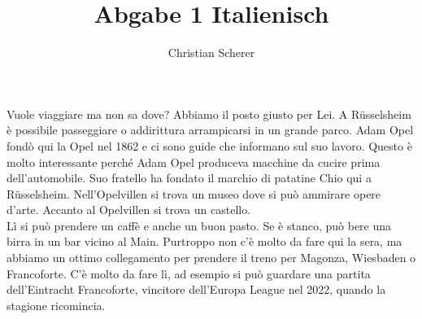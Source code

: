 \documentclass[10pt,a4paper]{article}
\author{Christian Scherer}
\title{Abgabe 1 Italienisch}
\date{}
\begin{document}
\maketitle
Vuole viaggiare ma non sa dove? Abbiamo il posto giusto per Lei.
A Rüsselsheim è possibile passeggiare o addirittura arrampicarsi in un grande parco. Adam Opel fondò qui la Opel nel 1862 e ci sono guide che informano sul suo lavoro. Questo è molto interessante perché Adam Opel produceva macchine da cucire prima dell'automobile. Suo fratello ha fondato il marchio di patatine Chio qui a Rüsselsheim. Nell'Opelvillen si trova un museo dove si può ammirare opere d'arte. Accanto al Opelvillen si trova un castello.\\
Lì si può prendere un caffè e anche un buon pasto. Se è stanco, può bere una birra in un bar vicino al Main. Purtroppo non c'è molto da fare qui la sera, ma abbiamo un ottimo collegamento per prendere il treno per Magonza, Wiesbaden o Francoforte. C'è molto da fare lì, ad esempio si può guardare una partita dell'Eintracht Francoforte, vincitore dell'Europa League nel 2022, quando la stagione ricomincia.
\end{document}
